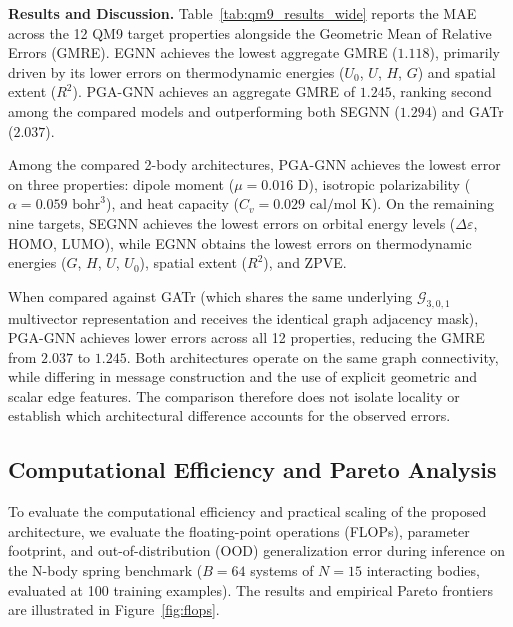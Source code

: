 \documentclass[10pt]{article}
\begin{document}
\noindent\textbf{Results and Discussion.}
Table~\ref{tab:qm9_results_wide} reports the MAE across the 12 QM9 target properties alongside the Geometric Mean of Relative Errors (GMRE). EGNN achieves the lowest aggregate GMRE ($1.118$), primarily driven by its lower errors on thermodynamic energies ($U_0$, $U$, $H$, $G$) and spatial extent ($R^2$). PGA-GNN achieves an aggregate GMRE of $1.245$, ranking second among the compared models and outperforming both SEGNN ($1.294$) and GATr ($2.037$).

Among the compared 2-body architectures, PGA-GNN achieves the lowest error on three properties: dipole moment ($\mu = 0.016\text{ D}$), isotropic polarizability ($\alpha = 0.059\text{ bohr}^3$), and heat capacity ($C_v = 0.029\text{ cal/mol K}$). On the remaining nine targets, SEGNN achieves the lowest errors on orbital energy levels ($\Delta\varepsilon$, HOMO, LUMO), while EGNN obtains the lowest errors on thermodynamic energies ($G$, $H$, $U$, $U_0$), spatial extent ($R^2$), and ZPVE.

When compared against GATr (which shares the same underlying $\mathcal{G}_{3,0,1}$ multivector representation and receives the identical graph adjacency mask), PGA-GNN achieves lower errors across all 12 properties, reducing the GMRE from $2.037$ to $1.245$. Both architectures operate on the same graph connectivity, while differing in message construction and the use of explicit geometric and scalar edge features. The comparison therefore does not isolate locality or establish which architectural difference accounts for the observed errors.

\subsection{Computational Efficiency and Pareto Analysis}
\label{subsec:pareto_efficiency}

To evaluate the computational efficiency and practical scaling of the proposed architecture, we evaluate the floating-point operations (FLOPs), parameter footprint, and out-of-distribution (OOD) generalization error during inference on the N-body spring benchmark ($B=64$ systems of $N=15$ interacting bodies, evaluated at 100 training examples). The results and empirical Pareto frontiers are illustrated in Figure~\ref{fig:flops}.
\end{document}

